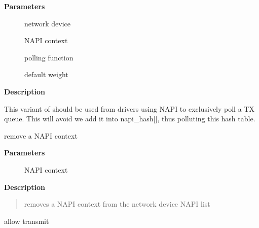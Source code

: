 \documentclass[a4paper,8pt,english]{sphinxmanual}
\begin{document}
\textbf{Parameters}
\begin{description}
\item[{}] \leavevmode
network device

\item[{}] \leavevmode
NAPI context

\item[{}] \leavevmode
polling function

\item[{}] \leavevmode
default weight

\end{description}

\textbf{Description}

This variant of {\hyperref[networking/kapi:c.netif_napi_add]{\emph{}}} should be used from drivers using NAPI
to exclusively poll a TX queue.
This will avoid we add it into napi\_hash{[}{]}, thus polluting this hash table.

\begin{fulllineitems}
\label{networking/kapi:c.netif_napi_del}
remove a NAPI context

\end{fulllineitems}


\textbf{Parameters}
\begin{description}
\item[{}] \leavevmode
NAPI context

\end{description}

\textbf{Description}
\begin{quote}

{\hyperref[networking/kapi:c.netif_napi_del]{\emph{}}} removes a NAPI context from the network device NAPI list
\end{quote}

\begin{fulllineitems}
\label{networking/kapi:c.netif_start_queue}
allow transmit

\end{fulllineitems}
\end{document}

